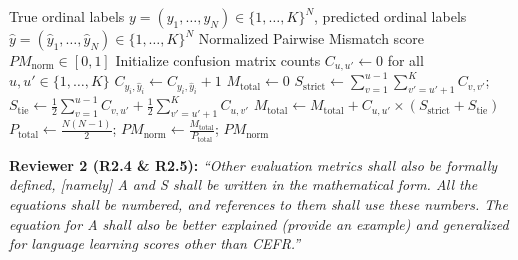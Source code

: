 \documentclass[11pt,a4paper]{article}
\begin{document}
\begin{algorithm}[!htbp]
\caption{Normalized Pairwise Mismatch ($PM_{\text{norm}}$) Computation via Confusion Matrix Counts}
\label{alg:rebuttal_pm}
\footnotesize
\begin{algorithmic}[1]
\Require True ordinal labels $y = (y_1, \dots, y_N) \in \{1, \dots, K\}^N$, predicted ordinal labels $\hat{y} = (\hat{y}_1, \dots, \hat{y}_N) \in \{1, \dots, K\}^N$
\Ensure Normalized Pairwise Mismatch score $PM_{\text{norm}} \in [0, 1]$
\State Initialize confusion matrix counts $C_{u,u'} \gets 0$ for all $u, u' \in \{1, \dots, K\}$ 
 $C_{y_i, \hat{y}_i} \gets C_{y_i, \hat{y}_i} + 1$ \EndFor
\State $M_{\text{total}} \gets 0$ 
            \State $S_{\text{strict}} \gets \sum_{v=1}^{u-1} \sum_{v'=u'+1}^{K} C_{v,v'}$; \quad $S_{\text{tie}} \gets \frac{1}{2} \sum_{v=1}^{u-1} C_{v,u'} + \frac{1}{2} \sum_{v'=u'+1}^{K} C_{u,v'}$
            \State $M_{\text{total}} \gets M_{\text{total}} + C_{u,u'} \times \left( S_{\text{strict}} + S_{\text{tie}} \right)$
        \EndIf
    \EndFor
\EndFor
\State $P_{\text{total}} \gets \frac{N(N - 1)}{2}$; \quad $PM_{\text{norm}} \gets \frac{M_{\text{total}}}{P_{\text{total}}}$; \quad \Return $PM_{\text{norm}}$
\end{algorithmic}
\end{algorithm}

\begin{reviewbox}
\textbf{Reviewer 2 (R2.4 \& R2.5):} \textit{``Other evaluation metrics shall also be formally defined, [namely] A and S shall be written in the mathematical form. All the equations shall be numbered, and references to them shall use these numbers. The equation for A shall also be better explained (provide an example) and generalized for language learning scores other than CEFR.''}
\end{reviewbox}
\end{document}
